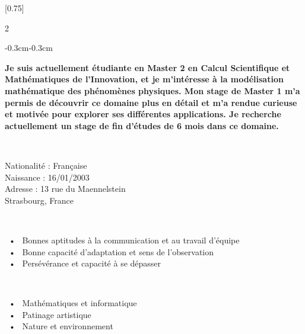\documentclass[lighthipster]{latex_for_CV/simplehipstercv}
\begin{document}
\setlength{\columnsep}{1.5cm}
[0.75]
\begin{paracol}{2}

\paracolbackgroundoptions


\footnotesize
{\setasidefontcolour
\begin{center}
\end{center}

\vspace{-0.8cm}
\begin{adjustwidth}{-0.3cm}{-0.3cm}
\begin{flushright}
{\textbf{\color{gray!130} Je suis actuellement étudiante en Master 2 en Calcul Scientifique et Mathématiques de l'Innovation, et je m'intéresse à la modélisation mathématique des phénomènes physiques. Mon stage de Master 1 m'a permis de découvrir ce domaine plus en détail et m'a rendue curieuse et motivée pour explorer ses différentes applications. Je recherche actuellement un stage de fin d'études de 6 mois dans ce domaine.}}
\end{flushright}
\end{adjustwidth}

\bigskip

\flushright
{} \\[0.5em]
\vspace{0.5em}

Nationalité : Française  \\
Naissance : 16/01/2003 \\
Adresse : 13 rue du Maennelstein \\ Strasbourg, France


\bigskip
\bigskip
\bigskip
{} \\[0.5em]
\vspace{0.5em}

~•~ Bonnes aptitudes à la communication et au travail d'équipe \\
~•~ Bonne capacité d'adaptation et sens de l'observation \\
~•~ Persévérance et capacité à se dépasser

\bigskip
\bigskip
\bigskip


\\[0.5em]
\vspace{0.5em}

~•~ Mathématiques et informatique \\
~•~ Patinage artistique \\
~•~ Nature et environnement \\

}
\end{paracol}
\end{document}
